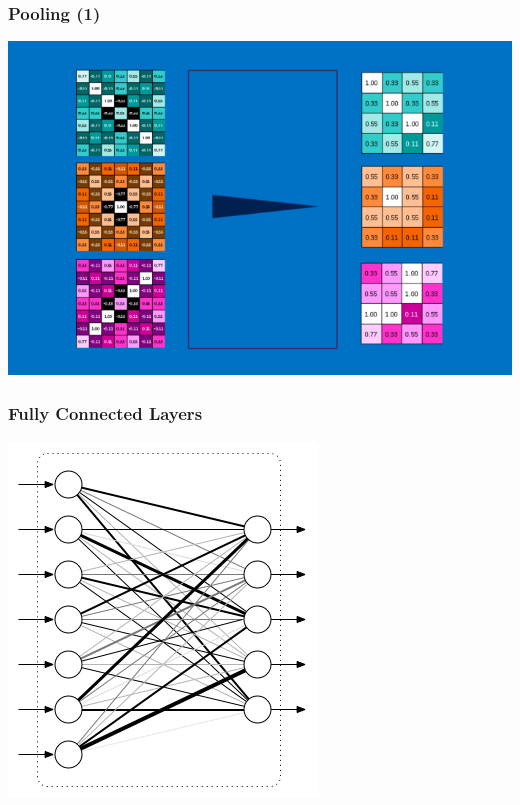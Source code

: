 \documentclass[11pt]{article}
\begin{document}
\subsubsection*{Pooling (1)}
\label{sec:org897c601}
\begin{center}
\begin{center}
\includegraphics[width=.9\linewidth]{images/pooling_2.png}
\end{center}
\end{center}
\subsubsection*{Fully Connected Layers}
\label{sec:org528f0f2}
\begin{center}
\begin{center}
\includegraphics[width=.9\linewidth]{images/layers.png}
\end{center}
\end{center}
\end{document}
